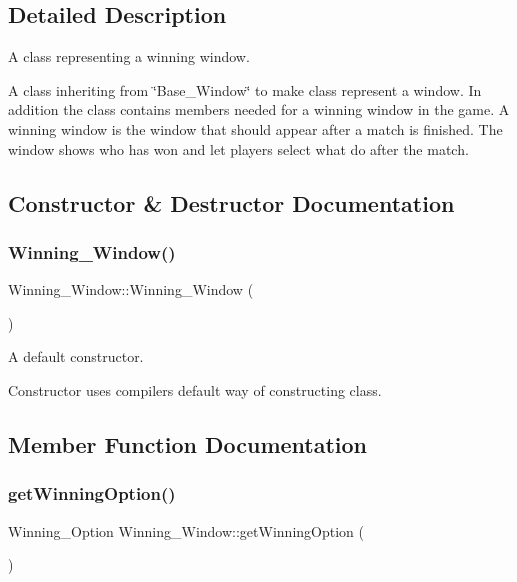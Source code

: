 \subsection{Detailed Description}
A class representing a winning window. 

A class inheriting from \char`\"{}\+Base\+\_\+\+Window\char`\"{} to make class represent a window. In addition the class contains members needed for a winning window in the game. A winning window is the window that should appear after a match is finished. The window shows who has won and let player\textquotesingle{}s select what do after the match. 

\subsection{Constructor \& Destructor Documentation}
\mbox{\label{classWinning__Window_adc2ffaa54ae59ffd3f50611dac1537b1}} 
\subsubsection{\texorpdfstring{Winning\+\_\+\+Window()}{Winning\_Window()}}
{\footnotesize\ttfamily Winning\+\_\+\+Window\+::\+Winning\+\_\+\+Window (\begin{DoxyParamCaption}{ }\end{DoxyParamCaption})\hspace{0.3cm}{\ttfamily [default]}}



A default constructor. 

Constructor uses compiler\textquotesingle{}s default way of constructing class. 

\subsection{Member Function Documentation}
\mbox{\label{classWinning__Window_aaa8755d6751054b38c9eb3b085db4fdf}} 
\subsubsection{\texorpdfstring{get\+Winning\+Option()}{getWinningOption()}}
{\footnotesize\ttfamily Winning\+\_\+\+Option Winning\+\_\+\+Window\+::get\+Winning\+Option (\begin{DoxyParamCaption}{ }\end{DoxyParamCaption})}



